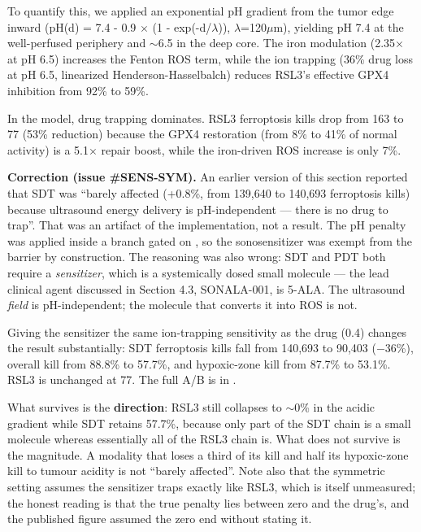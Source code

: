 \documentclass[11pt,twoside,openright]{report}
\begin{document}
To quantify this, we applied an exponential pH gradient from the tumor edge inward (pH(d) = 7.4 - 0.9 $\times$ (1 - exp(-d/$\lambda$)), $\lambda$=120$\mu$m), yielding pH 7.4 at the well-perfused periphery and $\sim$6.5 in the deep core. The iron modulation (2.35$\times$ at pH 6.5) increases the Fenton ROS term, while the ion trapping (36\% drug loss at pH 6.5, linearized Henderson-Hasselbalch) reduces RSL3's effective GPX4 inhibition from 92\% to 59\%.

In the model, drug trapping dominates. RSL3 ferroptosis kills drop from 163 to 77 (53\% reduction) because the GPX4 restoration (from 8\% to 41\% of normal activity) is a 5.1$\times$ repair boost, while the iron-driven ROS increase is only 7\%.

\textbf{Correction (issue \#SENS-SYM).} An earlier version of this section reported that SDT was ``barely affected (+0.8\%, from 139,640 to 140,693 ferroptosis kills) because ultrasound energy delivery is pH-independent --- there is no drug to trap''. That was an artifact of the implementation, not a result. The pH penalty was applied inside a branch gated on , so the sonosensitizer was exempt from the barrier by construction. The reasoning was also wrong: SDT and PDT both require a \textit{sensitizer}, which is a systemically dosed small molecule --- the lead clinical agent discussed in Section 4.3, SONALA-001, is 5-ALA. The ultrasound \textit{field} is pH-independent; the molecule that converts it into ROS is not.

Giving the sensitizer the same ion-trapping sensitivity as the drug (0.4) changes the result substantially: SDT ferroptosis kills fall from 140,693 to 90,403 ($-$36\%), overall kill from 88.8\% to 57.7\%, and hypoxic-zone kill from 87.7\% to 53.1\%. RSL3 is unchanged at 77. The full A/B is in .

What survives is the \textbf{direction}: RSL3 still collapses to $\sim$0\% in the acidic gradient while SDT retains 57.7\%, because only part of the SDT chain is a small molecule whereas essentially all of the RSL3 chain is. What does not survive is the magnitude. A modality that loses a third of its kill and half its hypoxic-zone kill to tumour acidity is not ``barely affected''. Note also that the symmetric setting assumes the sensitizer traps exactly like RSL3, which is itself unmeasured; the honest reading is that the true penalty lies between zero and the drug's, and the published figure assumed the zero end without stating it.
\end{document}
